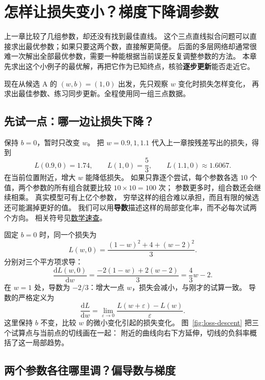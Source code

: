 
\chapterrule
\section{怎样让损失变小？梯度下降调参数}
\label{intro:gradient-descent}

上一章比较了几组参数，却还没有找到最佳直线。
这个三点直线拟合问题可以直接求出最优参数；如果只要这两个数，直接解更简便。
后面的多层网络却通常很难一次解出全部最优参数，需要一种能根据当前误差反复调整参数的方法。
本章先求出这个小例子的最优解，再把它作为已知终点，核验\textbf{逐步更新}能否走近它。

现在从候选 A 的 $(w,b)=(1,0)$ 出发，先只观察 $w$ 变化时损失怎样变化，
再求出最佳参数、练习同步更新。全程使用同一组三点数据。

\subsection{先试一点：哪一边让损失下降？}

保持 $b=0$，暂时只改变 $w$。
把 $w=0.9,1,1.1$ 代入上一章按残差写出的损失，得到
\[
L(0.9,0)=1.74,\qquad L(1,0)=\frac53,\qquad L(1.1,0)\approx1.6067.
\]
在当前位置附近，增大 $w$ 能降低损失。
如果只靠逐个尝试，每个参数各选 $10$ 个值，两个参数的所有组合就要比较 $10\times10=100$ 次；
参数更多时，组合数还会继续相乘。
真实模型可有上亿个参数，
穷举这样的组合难以承担，而且有限的候选还可能漏掉更好的值。
我们可以用\textbf{导数}描述这样的局部变化率，而不必每次试两个方向。
相关符号见\hyperref[app:math-tools]{数学速查}。

固定 $b=0$ 时，同一个损失为
\[
L(w,0)=\frac{(1-w)^2+4+(w-2)^2}{3}.
\]
分别对三个平方项求导：
\[
\frac{\mathrm dL(w,0)}{\mathrm dw}
=\frac{-2(1-w)+2(w-2)}{3}
=\frac43w-2.
\]
在 $w=1$ 处，导数为 $-2/3$：增大一点 $w$，损失会减小，与刚才的试算一致。
导数的严格定义为
\[
\frac{\mathrm dL}{\mathrm dw}
=\lim_{\varepsilon\to0}\frac{L(w+\varepsilon)-L(w)}{\varepsilon}.
\]
这里保持 $b$ 不变，比较 $w$ 的微小变化引起的损失变化。
图~\ref{fig:loss-descent} 把三个试算点与当前点的切线画在一起：
附近的曲线向右下方延伸，切线的负斜率概括了这一局部趋势。


\subsection{两个参数各往哪里调？偏导数与梯度}
\label{concept:gradient}

